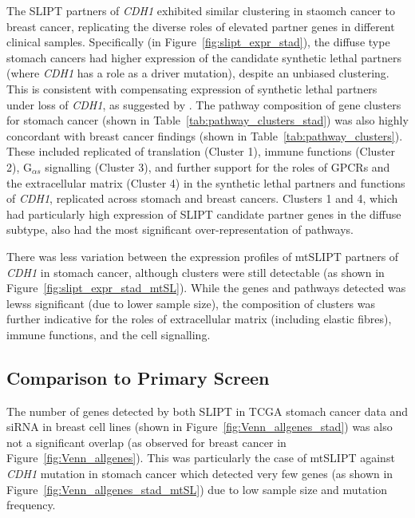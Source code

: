 The \gls{SLIPT} partners of \textit{CDH1} exhibited similar clustering in staomch cancer to breast cancer, replicating the diverse roles of elevated partner genes in different clinical samples. Specifically (in Figure~\ref{fig:slipt_expr_stad}), the diffuse type stomach cancers had higher expression of the candidate synthetic lethal partners (where \textit{CDH1} has a role as a driver mutation), despite an unbiased clustering. This is consistent with compensating expression of synthetic lethal partners under loss of \textit{CDH1}, as suggested by \citet{Lu2015}. The pathway composition of gene clusters for stomach cancer (shown in Table~\ref{tab:pathway_clusters_stad}) was also highly concordant with breast cancer findings (shown in Table~\ref{tab:pathway_clusters}). These included replicated of translation (Cluster 1), immune functions (Cluster 2), G$_{\alpha s}$ signalling (Cluster 3), and further support for the roles of GPCRs and the extracellular matrix (Cluster 4) in the synthetic lethal partners and functions of \textit{CDH1}, replicated across stomach and breast cancers. Clusters 1 and 4, which had particularly high expression of \gls{SLIPT} candidate partner genes in the diffuse subtype, also had the most significant over-representation of pathways.

There was less variation between the expression profiles of mtSLIPT partners of \textit{CDH1} in stomach cancer, although clusters were still detectable (as shown in Figure~\ref{fig:slipt_expr_stad_mtSL}). While the genes and pathways detected was lewss significant (due to lower sample size), the composition of clusters was further indicative for the roles of extracellular matrix (including elastic fibres), immune functions, and the cell signalling.

\FloatBarrier

\subsection{Comparison to Primary Screen} \label{chapt3:compare_SL_genes_stad}

The number of genes detected by both \gls{SLIPT} in TCGA stomach cancer data and siRNA in breast cell lines (shown in Figure~\ref{fig:Venn_allgenes_stad}) was also not a significant overlap (as observed for breast cancer in Figure~\ref{fig:Venn_allgenes}). This was particularly the case of mtSLIPT against \textit{CDH1} mutation in stomach cancer which detected very few genes (as shown in Figure~\ref{fig:Venn_allgenes_stad_mtSL}) due to low sample size and mutation frequency.

